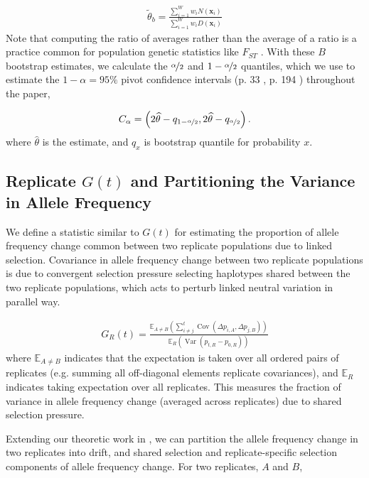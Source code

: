 \documentclass[11pt]{article}
\newcommand{\E}{\mathbb{E}}
\DeclareMathOperator{\var}{Var}
\DeclareMathOperator{\cov}{Cov}
\begin{document}
\begin{align}
  \tilde{\theta}_b = \frac{\sum_{i=1}^W w_i N(\mathbf{x}_i)}{\sum_{i=1}^W w_i D(\mathbf{x}_i)}
\end{align}
%
Note that computing the ratio of averages rather than the average of a ratio is
a practice common for population genetic statistics like $F_{ST}$
\parencite{Bhatia2013-zy}. With these $B$ bootstrap estimates, we calculate the
$\nicefrac{\alpha}{2}$ and $1-\nicefrac{\alpha}{2}$ quantiles, which we use to
estimate the $1-\alpha = 95\%$ pivot confidence intervals (p. 33
\cite{Wasserman2006-jl}, p. 194 \cite{Davison2013-oy}) throughout the paper,

\begin{align}
  C_\alpha = \left(2 \widehat{\theta} - q_{1-\nicefrac{\alpha}{2}}, 2 \widehat{\theta} - q_{\nicefrac{\alpha}{2}} \right).
\end{align}
%
where $\widehat{\theta}$ is the estimate, and $q_x$ is bootstrap quantile for
probability $x$.

\subsection{Replicate $G(t)$ and Partitioning the Variance in Allele Frequency}
\label{supp:replicate-g}

We define a statistic similar to $G(t)$ for estimating the proportion of allele
frequency change common between two replicate populations due to linked
selection. Covariance in allele frequency change between two replicate
populations is due to convergent selection pressure selecting haplotypes shared
between the two replicate populations, which acts to perturb linked neutral
variation in parallel way. 

\begin{align}
  G_R(t) = \frac{\E_{A \ne B}(\sum_{i\ne j}^t \cov(\Delta p_{i,A}, \Delta p_{j,B}))}{\E_R(\var(p_{t,R} - p_{0,R}))}
\end{align}
%
where $\E_{A \ne B}$ indicates that the expectation is taken over all ordered
pairs of replicates (e.g. summing all off-diagonal elements replicate
covariances), and $\E_R$ indicates taking expectation over all replicates. This
measures the fraction of variance in allele frequency change (averaged across
replicates) due to shared selection pressure.

Extending our theoretic work in \textcite{Buffalo2019-io}, we can partition the
allele frequency change in two replicates into drift, and shared selection and
replicate-specific selection components of allele frequency change. For two
replicates, $A$ and $B$, 
\end{document}
